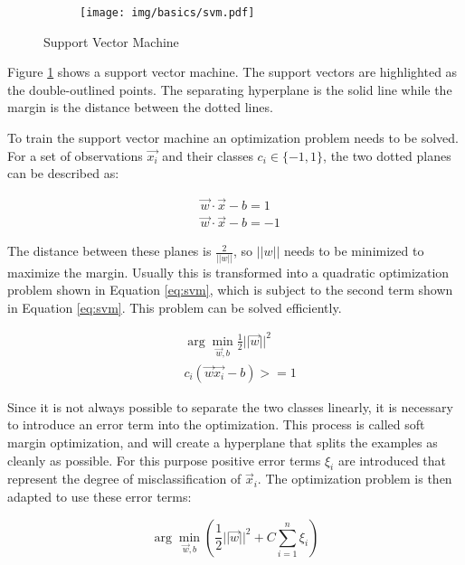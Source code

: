 \documentclass[pdftex,12pt,a4paper]{report}
\begin{document}
\begin{figure}[h]
	\centering
	\begin{subfigure}[b]{0.75\textwidth}
		\centering
		\texttt{[image: img/basics/svm.pdf]}
	\end{subfigure}
	\caption{Support Vector Machine}
	\label{fig:basics-svm}
\end{figure}

Figure \ref{fig:basics-svm} shows a support vector machine. The support vectors are highlighted as the double-outlined points. The separating hyperplane is the solid line while the margin is the distance between the dotted lines.

To train the support vector machine an optimization problem needs to be solved. For a set of observations $\vec{x_i}$ and their classes $c_i \in \{ -1, 1 \}$, the two dotted planes can be described as:

\begin{equation}
\begin{split}
	& \vec{w} \cdot \vec{x} - b = 1 \\
	& \vec{w} \cdot \vec{x} - b = -1
\end{split}
\end{equation}

The distance between these planes is $\frac{2}{||w||}$, so $||w||$ needs to be minimized to maximize the margin. Usually this is transformed into a quadratic optimization problem shown in Equation \ref{eq:svm}, which is subject to the second term shown in Equation \ref{eq:svm}. This problem can be solved efficiently.

\begin{equation}
\label{eq:svm}
\begin{split}
& \arg\min_{\vec{w}, b} \frac{1}{2} ||\vec{w}||^2 \\
& c_i (\vec{w} \vec{x_i} - b) >= 1
\end{split}
\end{equation}

Since it is not always possible to separate the two classes linearly, it is necessary to introduce an error term into the optimization. This process is called soft margin optimization, and will create a hyperplane that splits the examples as cleanly as possible. For this purpose positive error terms $\xi_i$ are introduced that represent the degree of misclassification of $\vec{x}_i$. The optimization problem is then adapted to use these error terms:

\begin{equation}
\arg\min_{\vec{w}, b} \left(\frac{1}{2} ||\vec{w}||^2 + C \sum_{i=1}^{n} \xi_i \right)
\end{equation}
\end{document}
